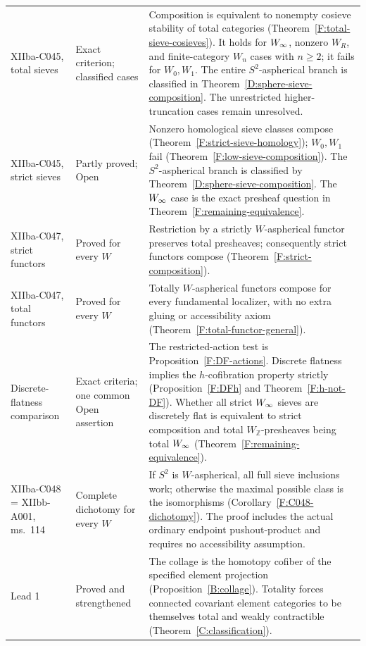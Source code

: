 \begin{longtable}{@{}>{\raggedright\arraybackslash}p{}>{\raggedright\arraybackslash}p{}>{\raggedright\arraybackslash}p{}@{}}
\addlinespace
XIIba-C045, total sieves & Exact criterion; classified cases & Composition is equivalent to nonempty cosieve stability of total categories (Theorem~\ref{F:total-sieve-cosieves}). It holds for $W_{\infty}$, nonzero $W_R$, and finite-category $W_n$ cases with $n\ge2$; it fails for $W_0,W_1$. The entire $S^2$-aspherical branch is classified in Theorem~\ref{D:sphere-sieve-composition}. The unrestricted higher-truncation cases remain unresolved. \\
\addlinespace
XIIba-C045, strict sieves & Partly proved; Open & Nonzero homological sieve classes compose (Theorem~\ref{F:strict-sieve-homology}); $W_0,W_1$ fail (Theorem~\ref{F:low-sieve-composition}). The $S^2$-aspherical branch is classified by Theorem~\ref{D:sphere-sieve-composition}. The $W_{\infty}$ case is the exact presheaf question in Theorem~\ref{F:remaining-equivalence}. \\
\addlinespace
XIIba-C047, strict functors & Proved for every $W$ & Restriction by a strictly $W$-aspherical functor preserves total presheaves; consequently strict functors compose (Theorem~\ref{F:strict-composition}). \\
\addlinespace
XIIba-C047, total functors & Proved for every $W$ & Totally $W$-aspherical functors compose for every fundamental localizer, with no extra gluing or accessibility axiom (Theorem~\ref{F:total-functor-general}). \\
\addlinespace
Discrete-flatness comparison & Exact criteria; one common Open assertion & The restricted-action test is Proposition~\ref{F:DF-actions}. Discrete flatness implies the $h$-cofibration property strictly (Proposition~\ref{F:DFh} and Theorem~\ref{F:h-not-DF}). Whether all strict $W_{\infty}$ sieves are discretely flat is equivalent to strict composition and total $W_{\mathbb Z}$-presheaves being total $W_{\infty}$ (Theorem~\ref{F:remaining-equivalence}). \\
\addlinespace
XIIba-C048 = XIIbb-A001, ms.~114 & Complete dichotomy for every $W$ & If $S^2$ is $W$-aspherical, all full sieve inclusions work; otherwise the maximal possible class is the isomorphisms (Corollary~\ref{F:C048-dichotomy}). The proof includes the actual ordinary endpoint pushout-product and requires no accessibility assumption. \\
\addlinespace
Lead 1 & Proved and strengthened & The collage is the homotopy cofiber of the specified element projection (Proposition~\ref{B:collage}). Totality forces connected covariant element categories to be themselves total and weakly contractible (Theorem~\ref{C:classification}). \\

\end{longtable}
